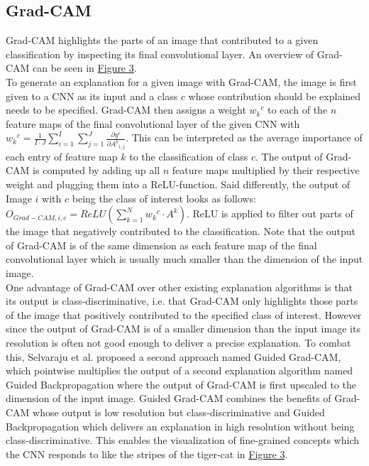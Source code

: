 \documentclass{article}
\begin{document}
\subsection{Grad-CAM}
Grad-CAM highlights the parts of an image that contributed to a given classification by inspecting its final convolutional layer. An overview of Grad-CAM can be seen in \hyperref[fig:gradcam]{Figure 3}. \\
To generate an explanation for a given image with Grad-CAM, the image is first given to a CNN as its input and a class $c$ whose contribution should be explained needs to be specified. Grad-CAM then assigns a weight ${w_k}^c$ to each of the $n$ feature maps of the final convolutional layer of the given CNN with ${w_k}^c = \frac{1}{I \cdot J} \sum\limits_{i=1}^{I} \sum\limits_{j=1}^J \frac{\partial y^c}{\partial {A^k}_{i,j}}$.
This can be interpreted as the average importance of each entry of feature map $k$ to the classification of class $c$. The output of Grad-CAM is computed by adding up all $n$ feature maps multiplied by their respective weight and plugging them into a ReLU-function. Said differently, the output of Image $i$ with $c$ being the class of interest looks as follows: $O_{Grad-CAM, i, c} = ReLU(\sum\limits_{k=1}^N {w_k}^c \cdot A^k)$. ReLU is applied to filter out parts of the image that negatively contributed to the classification. Note that the output of Grad-CAM is of the same dimension as each feature map of the final convolutional layer which is usually much smaller than the dimension of the input image. \\
One advantage of Grad-CAM over other existing explanation algorithms is that its output is class-discriminative, i.e. that Grad-CAM only highlights those parts of the image that positively contributed to the specified class of interest. However since the output of Grad-CAM is of a smaller dimension than the input image its resolution is often not good enough to deliver a precise explanation. To combat this, Selvaraju et al. proposed a second approach named Guided Grad-CAM, which pointwise multiplies the output of a second explanation algorithm named Guided Backpropagation \cite{springenberg2015striving} where the output of Grad-CAM is first upscaled to the dimension of the input image. 
Guided Grad-CAM combines the benefits of Grad-CAM whose output is low resolution but class-discriminative and Guided Backpropagation which delivers an explanation in high resolution without being class-discriminative. This enables the visualization of fine-grained concepts which the CNN responds to like the stripes of the tiger-cat in \hyperref[fig:gradcam]{Figure 3}. \\
\end{document}
